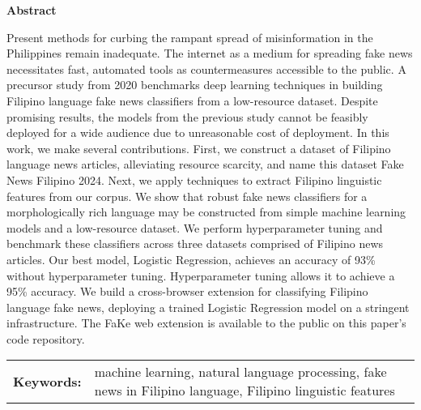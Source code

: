 
\begin{center}
    \textbf{Abstract}
    \end{center}
    \setlength{\parindent}{0pt}
    Present methods for curbing the rampant spread of misinformation in the Philippines remain inadequate. The internet as a medium for spreading fake news necessitates fast, automated tools as countermeasures accessible to the public. A precursor study from 2020 benchmarks deep learning techniques in building Filipino language fake news classifiers from a low-resource dataset. Despite promising results, the models from the previous study cannot be feasibly deployed for a wide audience due to unreasonable cost of deployment. In this work, we make several contributions. First, we construct a dataset of Filipino language news articles, alleviating resource scarcity, and name this dataset Fake News Filipino 2024. Next, we apply techniques to extract Filipino linguistic features from our corpus. We show that robust fake news classifiers for a morphologically rich language may be constructed from simple machine learning models and a low-resource dataset. We perform hyperparameter tuning and benchmark these classifiers across three datasets comprised of Filipino news articles. Our best model, Logistic Regression, achieves an accuracy of 93\% without hyperparameter tuning. Hyperparameter tuning allows it to achieve a 95\% accuracy. We build a cross-browser extension for classifying Filipino language fake news, deploying a trained Logistic Regression model on a stringent infrastructure. The FaKe web extension is available to the public on this paper's code repository.


    \begin{tabular}{lp{4.25in}}
    \hspace{-0.5em}\textbf{Keywords:}\hspace{0.25em} & machine learning, natural language processing, fake news in Filipino language, Filipino linguistic features
    \\
\end{tabular}

